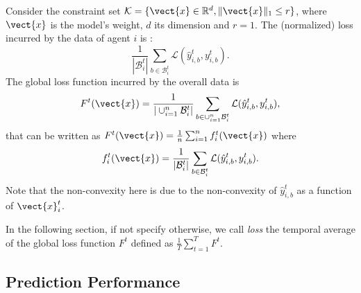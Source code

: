 Consider the constraint set $\mathcal{K} = \{\vect{x} \in \mathbb{R}^{d}, \|\vect{x}\|_1 \leq r\}$, where $\vect{x}$ is the model's weight, $d$ its dimension and $r=1$. The (normalized) loss incurred by the data of agent $i$ is :
$$
\frac{1}{|\mathcal{B}^t_i|}\sum_{b \in \mathcal{B}^t_i}\mathcal{L}(\hat{y}^t_{i,b},y^t_{i,b}).
$$ 
The global loss function incurred by the overall data is
\begin{align*}
F^t(\vect{x})
= \frac{1}{|\cup_{i=1}^{n} \mathcal{B}^t_i|}\sum_{b \in \cup_{i=1}^{n} \mathcal{B}^t_i}\mathcal{L}(\hat{y}^t_{i,b},y^t_{i,b}),
\end{align*}
that can be written as $F^t(\vect{x}) = \frac{1}{n} \sum_{i=1}^n f^t_i(\vect{x})$ where
%
\begin{align*}
f^t_i(\vect{x})= \frac{1}{|\mathcal{B}^t_i|} \sum_{b \in \mathcal{B}^t_i}\mathcal{L}(\hat{y}^t_{i,b},y^t_{i,b}).
\end{align*}
Note that the non-convexity here is due to the non-convexity of $\hat{y}^t_{i,b}$ as a function of $\vect{x}^t_i$. 

In the following section, if not specify otherwise, we call \emph{loss} the temporal average of the global loss function $F^t$ defined as $\frac{1}{T}\sum_{t=1}^{T} F^t$. 


\subsection{Prediction Performance }

